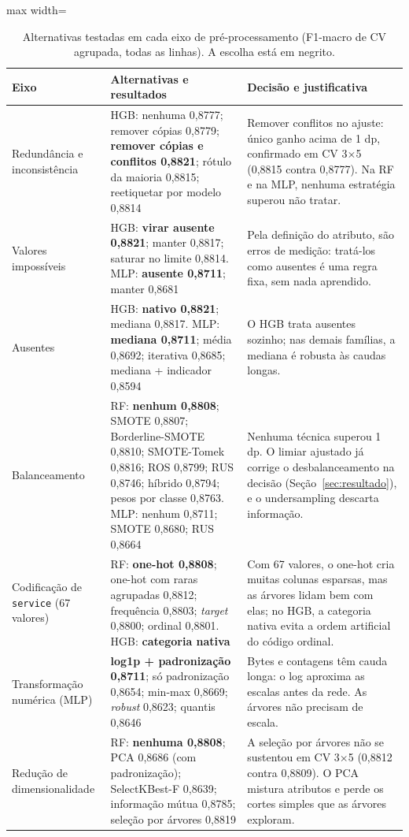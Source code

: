 \documentclass[11pt,a4paper]{article}
\begin{document}
\begin{table}[H]
\centering
\caption{Alternativas testadas em cada eixo de pré-processamento (F1-macro de CV agrupada, todas as linhas). A escolha está em negrito.}
\label{tab:pre}
\small
\begin{adjustbox}{max width=\linewidth}
\begin{tabular}{p{2.6cm}p{7.6cm}p{6.6cm}}
\toprule
Eixo & Alternativas e resultados & Decisão e justificativa \\
\midrule
Redundância e inconsistência & HGB: nenhuma 0,8777; remover cópias 0,8779; \textbf{remover cópias e conflitos 0,8821}; rótulo da maioria 0,8815; reetiquetar por modelo 0,8814 & Remover conflitos no ajuste: único ganho acima de 1 dp, confirmado em CV 3$\times$5 (0,8815 contra 0,8777). Na RF e na MLP, nenhuma estratégia superou não tratar. \\
Valores impossíveis & HGB: \textbf{virar ausente 0,8821}; manter 0,8817; saturar no limite 0,8814. MLP: \textbf{ausente 0,8711}; manter 0,8681 & Pela definição do atributo, são erros de medição: tratá-los como ausentes é uma regra fixa, sem nada aprendido. \\
Ausentes & HGB: \textbf{nativo 0,8821}; mediana 0,8817. MLP: \textbf{mediana 0,8711}; média 0,8692; iterativa 0,8685; mediana + indicador 0,8594 & O HGB trata ausentes sozinho; nas demais famílias, a mediana é robusta às caudas longas. \\
Balanceamento & RF: \textbf{nenhum 0,8808}; SMOTE 0,8807; Borderline-SMOTE 0,8810; SMOTE-Tomek 0,8816; ROS 0,8799; RUS 0,8746; híbrido 0,8794; pesos por classe 0,8763. MLP: nenhum 0,8711; SMOTE 0,8680; RUS 0,8664 & Nenhuma técnica superou 1 dp. O limiar ajustado já corrige o desbalanceamento na decisão (Seção~\ref{sec:resultado}), e o undersampling descarta informação. \\
Codificação de \texttt{service} (67 valores) & RF: \textbf{one-hot 0,8808}; one-hot com raras agrupadas 0,8812; frequência 0,8803; \emph{target} 0,8800; ordinal 0,8801. HGB: \textbf{categoria nativa} & Com 67 valores, o one-hot cria muitas colunas esparsas, mas as árvores lidam bem com elas; no HGB, a categoria nativa evita a ordem artificial do código ordinal. \\
Transformação numérica (MLP) & \textbf{log1p + padronização 0,8711}; só padronização 0,8654; min-max 0,8669; \emph{robust} 0,8623; quantis 0,8646 & Bytes e contagens têm cauda longa: o log aproxima as escalas antes da rede. As árvores não precisam de escala. \\
Redução de dimensionalidade & RF: \textbf{nenhuma 0,8808}; PCA 0,8686 (com padronização); SelectKBest-F 0,8639; informação mútua 0,8785; seleção por árvores 0,8819 & A seleção por árvores não se sustentou em CV 3$\times$5 (0,8812 contra 0,8809). O PCA mistura atributos e perde os cortes simples que as árvores exploram. \\
\bottomrule
\end{tabular}
\end{adjustbox}
\end{table}
\end{document}
